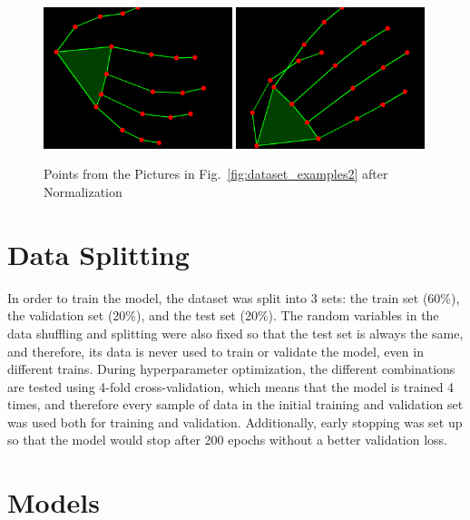 \begin{figure}[H]
\centerline{\includegraphics[width=0.49\textwidth]{figs/dataset_preprocessing3_1.png} \includegraphics[width=0.49\textwidth]{figs/dataset_preprocessing3_2.png}}
\caption[Points from the Pictures in Fig.~\ref{fig:dataset_examples2} after Normalization]{Points from the Pictures in Fig.~\ref{fig:dataset_examples2} after Normalization}
\label{fig:dataset_examples3}
\end{figure}

\section{Data Splitting}

In order to train the model, the dataset was split into 3 sets: the train set (60\%), the validation set (20\%), and the test set (20\%). The random variables in the data shuffling and splitting were also fixed so that the test set is always the same, and therefore, its data is never used to train or validate the model, even in different trains. During hyperparameter optimization, the different combinations are tested using 4-fold cross-validation, which means that the model is trained 4 times, and therefore every sample of data in the initial training and validation set was used both for training and validation. Additionally, early stopping was set up so that the model would stop after 200 epochs without a better validation loss.

\section{Models}

